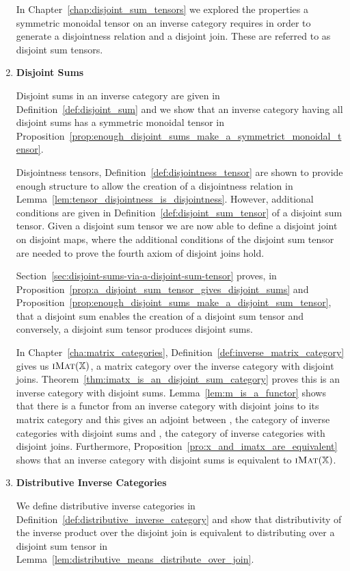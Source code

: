 \begin{enumerate}
In Chapter~\ref{chap:disjoint_sum_tensors} we explored the properties a symmetric monoidal tensor
on an inverse category requires in order to generate a disjointness relation and a disjoint
join. These are referred to as disjoint sum tensors.

\item \textbf{Disjoint Sums}

Disjoint sums in an inverse category are given in Definition~\ref{def:disjoint_sum} and we show that
an inverse category having all disjoint sums has a symmetric monoidal tensor in
Proposition~\ref{prop:enough_disjoint_sums_make_a_symmetrict_monoidal_tensor}.

Disjointness tensors, Definition~\ref{def:disjointness_tensor} are shown to provide enough structure
to allow the creation of a disjointness relation in
Lemma~\ref{lem:tensor_disjointness_is_disjointness}. However, additional conditions are given in
Definition~\ref{def:disjoint_sum_tensor} of a disjoint sum tensor. Given a disjoint sum tensor we
are now able to define a disjoint joint on disjoint maps, where the additional conditions of the
disjoint sum tensor are needed to prove the fourth axiom of disjoint joins hold.

Section~\ref{sec:disjoint-sums-via-a-disjoint-sum-tensor} proves, in
Proposition~\ref{prop:a_disjoint_sum_tensor_gives_disjoint_sums} and
Proposition~\ref{prop:enough_disjoint_sums_make_a_disjoint_sum_tensor}, that a disjoint sum enables
the creation of a disjoint sum tensor and conversely, a disjoint sum tensor produces disjoint sums.

In Chapter~\ref{cha:matrix_categories}, Definition~\ref{def:inverse_matrix_category} gives us
$\textsc{iMat}({\mathbb{X}})$, a matrix category over the inverse category \X with disjoint
joins. Theorem~\ref{thm:imatx_is_an_disjoint_sum_category} proves this is an inverse category with
disjoint sums. Lemma~\ref{lem:m_is_a_functor} shows that there is a functor from an inverse category
with disjoint joins to its matrix category and this gives an adjoint between \DSum, the category of
inverse categories with disjoint sums and \DJoin, the category of inverse categories with disjoint
joins. Furthermore, Proposition~\ref{pro:x_and_imatx_are_equivalent} shows that an inverse category
\X with disjoint sums is equivalent to $\textsc{iMat}({\mathbb{X}})$.


\item \textbf{Distributive Inverse Categories}

We define distributive inverse categories in Definition~\ref{def:distributive_inverse_category} and
show that distributivity of the inverse product over the disjoint join is equivalent to distributing
over a disjoint sum tensor in Lemma~\ref{lem:distributive_means_distribute_over_join}.


\end{enumerate}
